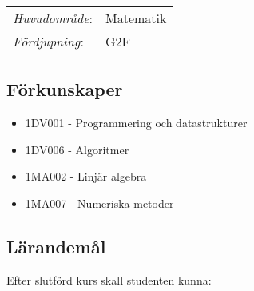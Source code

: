 \begin{tabular}{ll}
\emph{Huvudområde}: & Matematik\tabularnewline
\emph{Fördjupning}: & G2F\tabularnewline
\end{tabular}

\subsection*{Förkunskaper}

\begin{itemize}
\tightlist
\item
  1DV001 - Programmering och datastrukturer
\item
  1DV006 - Algoritmer
\item
  1MA002 - Linjär algebra
\item
  1MA007 - Numeriska metoder
\end{itemize}

\subsection*{Lärandemål}

Efter slutförd kurs skall studenten kunna:


